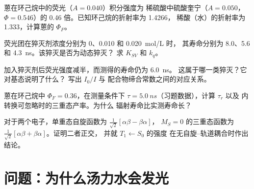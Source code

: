 \begin{exercise}[$\star\star$]\label{exo:b3:electronic-spectroscopy:8}
蒽在环己烷中的荧光（$A = 0.040$）积分强度为
稀硫酸中硫酸奎宁（$A = 0.050$，$\Phi =
0.546$）的 0.46 倍。已知环己烷的折射率为 1.4266，
稀酸（水）的折射率为 1.333，计算蒽的 $\Phi_F$。
\end{exercise}

\begin{exercise}[$\star\star$]\label{exo:b3:electronic-spectroscopy:9}
荧光团在猝灭剂浓度分别为 0、0.010 和 \qty{0.020}{mol/L} 时，
其寿命分别为 8.0、5.6 和 \qty{4.3}{ns}。该猝灭是否为动态猝灭？
求 $K_{SV}$ 和 $k_q$。
\end{exercise}

\begin{exercise}[$\star\star\star$]\label{exo:b3:electronic-spectroscopy:10}
加入猝灭剂后荧光强度减半，而测得的寿命仍为 \qty{6.0}{ns}。
这属于哪一类猝灭？它对基态说明了什么？
写出 $I_0/I$ 与
配合物缔合常数之间的对应关系。
\end{exercise}

\begin{exercise}[$\star\star\star$]\label{exo:b3:electronic-spectroscopy:11}
蒽在环己烷中 $\Phi_F = 0.36$，在测量条件下
$\tau = \qty{5.0}{ns}$（习题数据），计算 $\tau_r$ 以及
内转换可忽略时的三重态产率。为什么
辐射寿命比实测寿命长？
\end{exercise}

\begin{exercise}[$\star\star\star$]\label{exo:b3:electronic-spectroscopy:12}
对于两个电子，单重态自旋函数为 $\frac{1}{\sqrt2}[\alpha\beta - \beta\alpha]$，
$M_S = 0$ 的三重态函数为 $\frac{1}{\sqrt2}[\alpha\beta + \beta\alpha]$。证明二者正交，
并就 $T_1 \leftarrow S_0$ 的强度
在无自旋–轨道耦合时作出结论。
\end{exercise}

\section{问题：为什么汤力水会发光}

